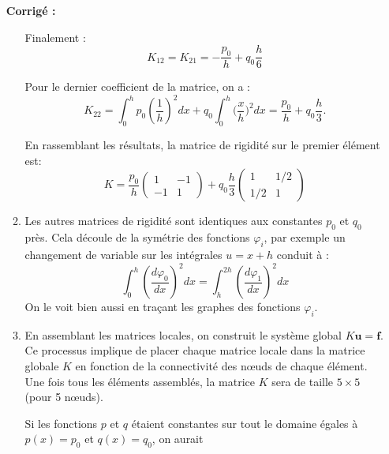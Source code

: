 \documentclass[a4paper,12pt]{article}
\newif\ifcorriges
\newenvironment{solution}
  {
    \ifcorriges
      \begin{framed}
      \par\noindent\textbf{Corrigé :} 
  }
  {
      \end{framed}
    \fi
  }
\begin{document}
\begin{enumerate}
\begin{solution}
\begin{enumerate}
                Finalement :
                \[
                K_{12} = K_{21} = -\frac{p_0}{h} + q_0 \frac{h}{6}
                \]
                
                Pour le dernier coefficient de la matrice, on a :
                \[
                K_{22} = \int_{0}^{h} p_0 \left( \frac{1}{h} \right)^2 dx  + q_0 \int_{0}^{h} \Big(\frac{x}{h}\Big)^2 dx = \frac{p_0}{h} + q_0 \frac{h}{3}.
                \]
                
                En rassemblant les résultats, la matrice de rigidité sur le premier élément est:
                \[
                K = \frac{p_0}{h}
                \begin{pmatrix}
                    1 & -1 \\
                    -1 & 1
                \end{pmatrix}
                + q_0 \frac{h}{3}
                \begin{pmatrix}
                    1 & 1/2 \\
                    1/2 & 1
                \end{pmatrix}
                \]

                \item Les autres matrices de rigidité sont identiques aux constantes $p_0$ et $q_0$ près. Cela découle de la symétrie des fonctions $\varphi_i$, par exemple un changement de variable sur les intégrales $u=x+h$ conduit à :
                \[
                \int_0^h \left( \frac{d\varphi_0}{dx} \right)^2 dx = \int_h^{2h} \left( \frac{d\varphi_1}{dx} \right)^2 dx 
                \]
                On le voit bien aussi en traçant les graphes des fonctions $\varphi_i$.
                \item En assemblant les matrices locales, on construit le système global $K \mathbf{u} = \mathbf{f}$. Ce processus implique de placer chaque matrice locale dans la matrice globale $K$ en fonction de la connectivité des nœuds de chaque élément. 
                Une fois tous les éléments assemblés, la matrice $K$ sera de taille $5 \times 5$ (pour 5 nœuds).

                Si les fonctions $p$ et $q$ étaient constantes sur tout le domaine égales à $p(x)=p_0$ et $q(x)=q_0$, on aurait


\end{enumerate}
\end{solution}
\end{enumerate}
\end{document}
